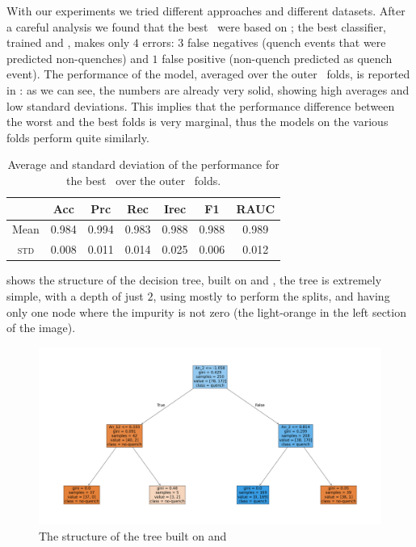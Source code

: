 With our experiments we tried different approaches and different datasets. After a careful analysis
we found that the best \dts\ were based on \an; the best classifier, trained \an[2] and \an[12],
makes only $4$ errors: $3$ false negatives (quench events that were predicted non-quenches)
and $1$ false positive (non-quench predicted as quench event). The performance of the model,
averaged over the outer \cv\ folds, is reported in : as we can see, the
numbers are already very solid, showing high averages and low standard deviations. This implies that
the performance difference between the worst and the best folds is very marginal, thus the models on
the various folds perform quite similarly.
\begin{table}[!ht]
	\caption{Average and standard deviation of the performance for the best \dt\ over the outer \cv\
		folds.}\label{tbl:an-2-12-perf}

	\bigskip
	\setlength{\tabcolsep}{6pt}
	\centering
	\begin{tabular}{ccccccc}
		\toprule
		\textbf{}    & \textbf{Acc} & \textbf{Prc} & \textbf{Rec} & \textbf{Irec} & \textbf{F1} & \textbf{RAUC} \\
		\midrule
		Mean         & 0.984        & 0.994        & 0.983        & 0.988         & 0.988
		             & 0.989                                                                                    \\
		\textsc{std} & 0.008        & 0.011        & 0.014        & 0.025         & 0.006
		             & 0.012                                                                                    \\
		\bottomrule
	\end{tabular}
\end{table}

 shows the structure of the decision tree, built on \an[2] and \an[12], the
tree is extremely simple, with a depth of just $2$, using mostly \an[2] to perform the splits, and
having only one node where the impurity is not zero (the light-orange in the left section of the
image).
\begin{figure}[!ht]
	\centering
	\includegraphics[width=0.7\linewidth]{img/An_2_12_pt_dt.png}
	\caption{The structure of the tree built on \an[2] and \an[12]} \label{fig:dt-an-2-12-pt}
\end{figure}

